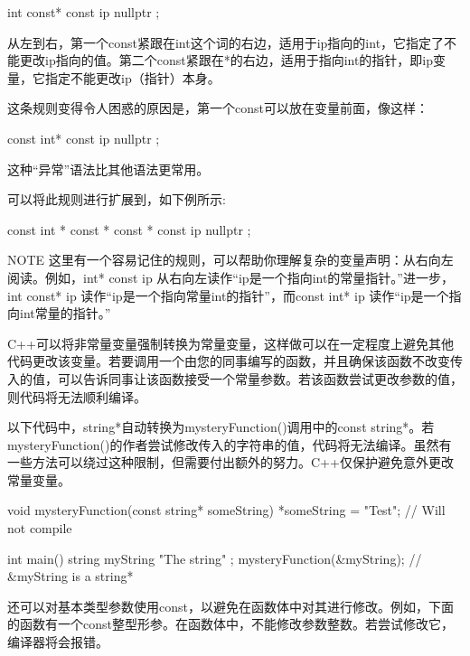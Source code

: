 \begin{cpp}
int const* const ip { nullptr };
\end{cpp}

从左到右，第一个const紧跟在int这个词的右边，适用于ip指向的int，它指定了不能更改ip指向的值。第二个const紧跟在*的右边，适用于指向int的指针，即ip变量，它指定不能更改ip（指针）本身。

这条规则变得令人困惑的原因是，第一个const可以放在变量前面，像这样：

\begin{cpp}
const int* const ip { nullptr };
\end{cpp}

这种“异常”语法比其他语法更常用。

可以将此规则进行扩展到，如下例所示:

\begin{cpp}
const int * const * const * const ip { nullptr };
\end{cpp}

\begin{myNotic}{NOTE}
这里有一个容易记住的规则，可以帮助你理解复杂的变量声明：从右向左阅读。例如，int* const ip 从右向左读作“ip是一个指向int的常量指针。”进一步，int const* ip 读作“ip是一个指向常量int的指针”，而const int* ip 读作“ip是一个指向int常量的指针。”
\end{myNotic}


C++可以将非常量变量强制转换为常量变量，这样做可以在一定程度上避免其他代码更改该变量。若要调用一个由您的同事编写的函数，并且确保该函数不改变传入的值，可以告诉同事让该函数接受一个常量参数。若该函数尝试更改参数的值，则代码将无法顺利编译。

以下代码中，string*自动转换为mysteryFunction()调用中的const string*。若mysteryFunction()的作者尝试修改传入的字符串的值，代码将无法编译。虽然有一些方法可以绕过这种限制，但需要付出额外的努力。C++仅保护避免意外更改常量变量。


\begin{cpp}
void mysteryFunction(const string* someString)
{
    *someString = "Test"; // Will not compile
}

int main()
{
    string myString { "The string" };
    mysteryFunction(&myString); // &myString is a string*
}
\end{cpp}

还可以对基本类型参数使用const，以避免在函数体中对其进行修改。例如，下面的函数有一个const整型形参。在函数体中，不能修改参数整数。若尝试修改它，编译器将会报错。

